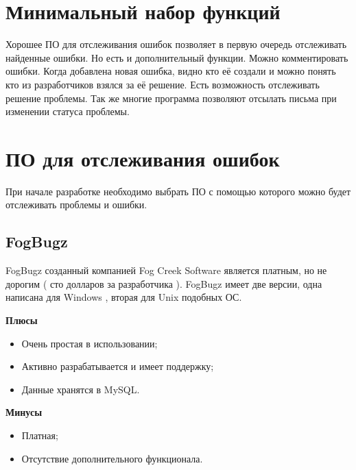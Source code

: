 \section{ Минимальный набор функций } \label{sect2_15}

Хорошее ПО для отслеживания ошибок позволяет в первую очередь отслеживать найденные ошибки. Но есть и дополнительный функции. Можно комментировать ошибки. Когда добавлена новая ошибка, видно кто её создали  и можно понять кто из разработчиков взялся за её решение. Есть возможность отслеживать решение проблемы. Так же многие программа позволяют отсылать письма при изменении статуса проблемы.

\section{ ПО для отслеживания ошибок } \label{sect2_16}

При начале разработке необходимо выбрать ПО с помощью которого можно будет отслеживать проблемы и ошибки.

\subsection{ FogBugz } \label{sect2_16_1}

FogBugz созданный компанией Fog Creek Software является платным, но не дорогим ( сто долларов за разработчика ). FogBugz имеет две версии, одна написана для Windows , вторая для Unix  подобных ОС.

\textbf{Плюсы}

\begin{itemize}

\item Очень простая в использовании;

\item Активно разрабатывается и имеет поддержку;

\item Данные хранятся в MySQL.

\end{itemize}

\textbf{Минусы}

\begin{itemize}

\item Платная;

\item Отсутствие дополнительного функционала.

\end{itemize}

